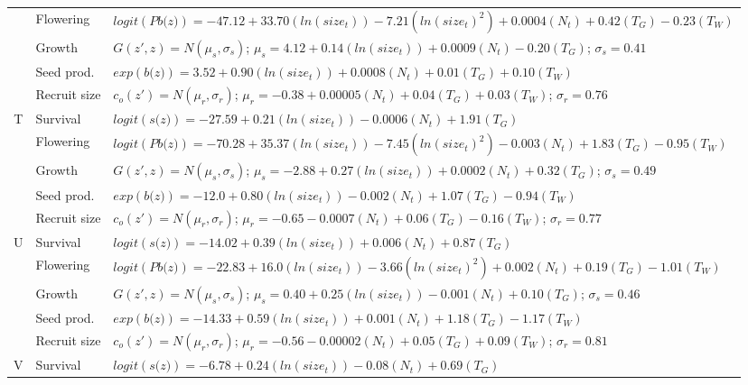\documentclass[12pt, letterpaper]{article}
\begin{document}
\begin{spacing}{1.3}
\begin{longtable}[ht!]{c|l|p{}}
         & Flowering  & $logit(\textit{Pb(z)}) = -47.12 + 33.70(ln(size_t)) -7.21(ln(size_t)^2) +0.0004 (N_t) + 0.42 (T_G) - 0.23 (T_W)$ \\
         \rowcolor[gray]{.95}& Growth  &  $G(z',z) = N(\mu_s, \sigma_s)$; $\mu_s = 4.12 + 0.14(ln(size_t)) +0.0009(N_t) -0.20 (T_G)$; $\sigma_s = 0.41$\\
         & Seed prod.  & $exp(\textit{b(z)}) = 3.52 + 0.90(ln(size_t)) + 0.0008 (N_t) + 0.01 (T_G) + 0.10 (T_W)$  \\
         \rowcolor[gray]{.95}& Recruit size  &  $c_o(z') = N(\mu_r, \sigma_r)$; $\mu_r = -0.38 + 0.00005 (N_t) + 0.04 (T_G) + 0.03 (T_W) $; $\sigma_r = 0.76$ \\
         \hline
         T  &  Survival  &  $logit(\textit{s(z)})= -27.59 + 0.21(ln(size_t)) -0.0006(N_t) + 1.91 (T_G)$ \\
         \rowcolor[gray]{.95}& Flowering  & $logit(\textit{Pb(z)})  = -70.28 + 35.37(ln(size_t)) -7.45(ln(size_t)^2) - 0.003 (N_t) + 1.83 (T_G) - 0.95 (T_W)$ \\
         & Growth  &  $G(z',z) = N(\mu_s, \sigma_s)$; $\mu_s = -2.88 + 0.27(ln(size_t)) +0.0002 (N_t) + 0.32 (T_G)$; $\sigma_s = 0.49$\\
         \rowcolor[gray]{.95}& Seed prod.  & $exp(\textit{b(z)}) = -12.0 + 0.80(ln(size_t)) -0.002 (N_t) + 1.07 (T_G) - 0.94 (T_W)$  \\
         & Recruit size  &  $c_o(z') = N(\mu_r, \sigma_r)$; $\mu_r = -0.65 -0.0007 (N_t) + 0.06 (T_G) - 0.16 (T_W) $; $\sigma_r = 0.77$ \\
         \hline
         \rowcolor[gray]{.95}U  &  Survival  &  $logit(\textit{s(z)})= -14.02 + 0.39(ln(size_t)) + 0.006(N_t) + 0.87 (T_G)$ \\
         & Flowering  & $logit(\textit{Pb(z)})  = -22.83 + 16.0(ln(size_t)) -3.66(ln(size_t)^2) + 0.002 (N_t) + 0.19 (T_G) - 1.01 (T_W)$ \\
         \rowcolor[gray]{.95}& Growth  &  $G(z',z) = N(\mu_s, \sigma_s)$; $\mu_s = 0.40 + 0.25(ln(size_t)) - 0.001 (N_t) + 0.10 (T_G)$; $\sigma_s = 0.46$\\
         & Seed prod.  & $exp(\textit{b(z)}) = -14.33 + 0.59(ln(size_t)) + 0.001 (N_t) + 1.18 (T_G) - 1.17 (T_W)$  \\
         \rowcolor[gray]{.95}& Recruit size  &  $c_o(z') = N(\mu_r, \sigma_r)$; $\mu_r = -0.56 -0.00002 (N_t) + 0.05 (T_G) + 0.09 (T_W) $; $\sigma_r = 0.81$ \\
         \hline
         V  &  Survival  &  $logit(\textit{s(z)})= -6.78 + 0.24(ln(size_t)) -0.08(N_t) + 0.69 (T_G)$ \\

\end{longtable}
\end{spacing}
\end{document}
